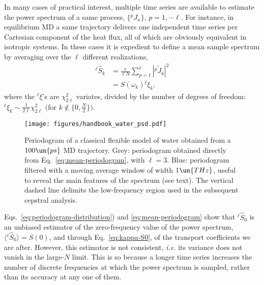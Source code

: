 In many cases of practical interest, multiple time series are available to estimate the power spectrum of a same process, $\{{^p\!}J_n\}$, $p=1, \cdots \ell$. For instance, in equilibrium MD a same trajectory delivers one independent time series per Cartesian component of the heat flux, all of which are obviously equivalent in isotropic systems. In these cases it is expedient to define a mean sample spectrum by averaging over the $\ell$ different realizations,
\begin{equation}
    \begin{aligned}
      {^{\ell\!}\hat{S}}_{k}& = \frac{\epsilon}{\ell N} \sum_{p=1}^{\ell}  \left |{^p\!}{\tilde J}_{k} \right |^2 \\
      & = S \left(\omega_k\right) {^{\ell\!}{\xi}_{k}},
    \end{aligned} \label{eq:mean-periodogram}
\end{equation}
where the ${^{\ell\!}\xi}$'s are $\chi_{2\ell}^2$ variates, divided by the number of degrees of freedom: $^{\ell\!}\xi_{k}\sim\frac{1}{2\ell}\chi_{2\ell}^{2}$ $\bigl (\text{for } k \notin \{ 0,\frac{N}{2} \}\bigr )$.

\begin{figure}
\centering
\texttt{[image: figures/handbook\_water\_psd.pdf]}
\caption{Periodogram of a classical flexible model of water obtained from a $100\un{ps}$ MD trajectory. Grey: periodogram obtained directly from Eq.~\eqref{eq:mean-periodogram}, with $\ell=3$. Blue: periodogram filtered with a moving average window of width $1\un{THz}$, useful to reveal the main features of the spectrum (see text). The vertical dashed line delimits the low-frequency region used in the subsequent cepstral analysis.}  \label{fig:water-periodogram}
\end{figure}

Eqs.~\eqref{eq:periodogram-distribution}) and \eqref{eq:mean-periodogram} show that ${^{\ell\!}}{\hat S_0}$ is an unbiased estimator of the zero-frequency value of the power spectrum, $\langle {^{\ell\!}}{\hat S_0} \rangle = S(0)$, and through Eq.~\eqref{eq:kappa-S0}, of the transport coefficients we are after. However, this estimator is not consistent, \emph{i.e.} its variance does not vanish in the large-$N$ limit. This is so because a longer time series increases the number of discrete frequencies at which the power spectrum is sampled, rather than its accuracy at any one of them.

